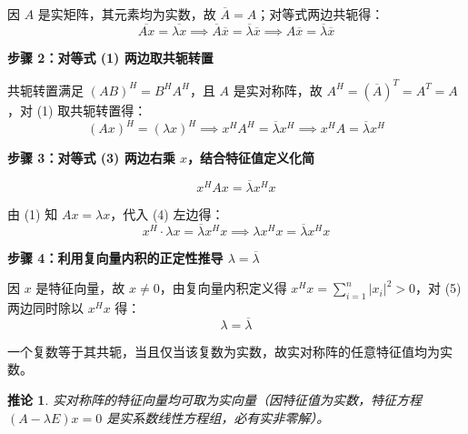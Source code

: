 \documentclass[10pt]{article}
\numberwithin{equation}{section}
\theoremstyle{plain}
\newtheorem{corollary}[theorem]{推论}
\theoremstyle{definition}
\theoremstyle{remark}
\begin{document}
因 $A$ 是实矩阵，其元素均为实数，故 $\overline{A}=A$；对等式两边共轭得：
\begin{equation}
	\overline{Ax}=\overline{\lambda x}\implies\overline{A}\overline{x}=\overline{\lambda}\overline{x}\implies A\overline{x}=\overline{\lambda}\overline{x}
\end{equation}

{\par\vspace{0.8ex}\noindent\normalsize\bfseries\color{secblue} 步骤 2：对等式 (1) 两边取共轭转置\par}

共轭转置满足 $(AB)^H=B^H A^H$，且 $A$ 是实对称阵，故 $A^H=(\overline{A})^T=A^T=A$，对 (1) 取共轭转置得：
\begin{equation}
	(Ax)^H=(\lambda x)^H\implies x^H A^H=\overline{\lambda} x^H\implies x^H A=\overline{\lambda} x^H
\end{equation}

{\par\vspace{0.8ex}\noindent\normalsize\bfseries\color{secblue} 步骤 3：对等式 (3) 两边右乘 $x$，结合特征值定义化简\par}

\begin{equation}
	x^H Ax=\overline{\lambda} x^H x
\end{equation}

由 (1) 知 $Ax=\lambda x$，代入 (4) 左边得：
\begin{equation}
	x^H\cdot\lambda x=\overline{\lambda} x^H x\implies\lambda x^H x=\overline{\lambda} x^H x
\end{equation}

{\par\vspace{0.8ex}\noindent\normalsize\bfseries\color{secblue} 步骤 4：利用复向量内积的正定性推导 $\lambda=\overline{\lambda}$\par}

因 $x$ 是特征向量，故 $x\neq 0$，由复向量内积定义得 $x^H x=\sum_{i=1}^n |x_i|^2 > 0$，对 (5) 两边同时除以 $x^H x$ 得：
\[\lambda=\overline{\lambda}\]

一个复数等于其共轭，当且仅当该复数为实数，故实对称阵的任意特征值均为实数。

\begin{corollary}
	实对称阵的特征向量均可取为实向量（因特征值为实数，特征方程 $(A-\lambda E)x=0$ 是实系数线性方程组，必有实非零解）。
\end{corollary}
\end{document}
